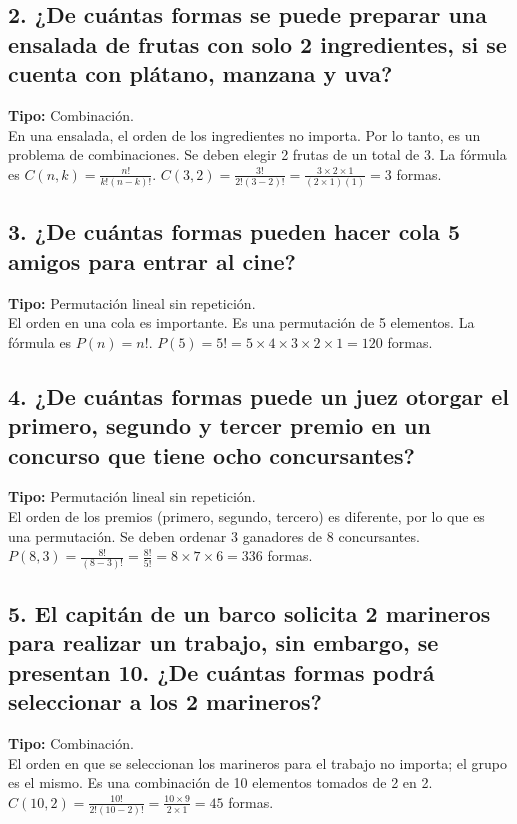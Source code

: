 \documentclass[11pt]{article}
\begin{document}
    \subsection*{2. ¿De cuántas formas se puede preparar una ensalada de frutas con solo 2 ingredientes, si se cuenta con plátano, manzana y uva?}
    \textbf{Tipo:} Combinación. \\
    En una ensalada, el orden de los ingredientes no importa. Por lo tanto, es un problema de combinaciones. Se deben elegir 2 frutas de un total de 3.
    La fórmula es $C(n,k) = \frac{n!}{k!(n-k)!}$.
    $C(3,2) = \frac{3!}{2!(3-2)!} = \frac{3 \times 2 \times 1}{(2 \times 1)(1)} = 3$ formas.

    \subsection*{3. ¿De cuántas formas pueden hacer cola 5 amigos para entrar al cine?}
    \textbf{Tipo:} Permutación lineal sin repetición. \\
    El orden en una cola es importante. Es una permutación de 5 elementos.
    La fórmula es $P(n) = n!$.
    $P(5) = 5! = 5 \times 4 \times 3 \times 2 \times 1 = 120$ formas.

    \subsection*{4. ¿De cuántas formas puede un juez otorgar el primero, segundo y tercer premio en un concurso que tiene ocho concursantes?}
    \textbf{Tipo:} Permutación lineal sin repetición. \\
    El orden de los premios (primero, segundo, tercero) es diferente, por lo que es una permutación. Se deben ordenar 3 ganadores de 8 concursantes.
    $P(8,3) = \frac{8!}{(8-3)!} = \frac{8!}{5!} = 8 \times 7 \times 6 = 336$ formas.

    \subsection*{5. El capitán de un barco solicita 2 marineros para realizar un trabajo, sin embargo, se presentan 10. ¿De cuántas formas podrá seleccionar a los 2 marineros?}
    \textbf{Tipo:} Combinación. \\
    El orden en que se seleccionan los marineros para el trabajo no importa; el grupo es el mismo. Es una combinación de 10 elementos tomados de 2 en 2.
    $C(10,2) = \frac{10!}{2!(10-2)!} = \frac{10 \times 9}{2 \times 1} = 45$ formas.
\end{document}
